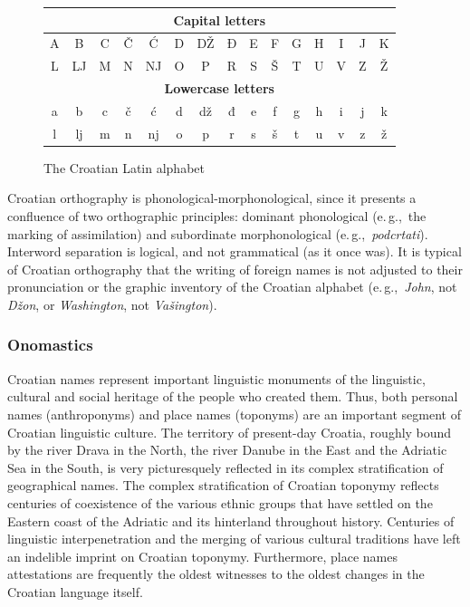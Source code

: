 \begin{multicols}{2}
\begin{figure}[htb]
\centering
	\begin{tabular} {|c|c|c|c|c|c|c|c|c|c|c|c|c|c|c|}
        \hline
        \multicolumn{15}{|c|}{\textbf{Capital letters}} \\ \hline
        A & B  & C & Č & Ć  & D & DŽ & Đ & E & F & G & H & I & J & K \\ \hline
        L & LJ & M & N & NJ & O & P  & R & S & Š & T & U & V & Z & Ž \\ \hline
        \multicolumn{15}{|c|}{\textbf{Lowercase letters}} \\ \hline
        a & b  & c & č & ć  & d & dž & đ & e & f & g & h & i & j & k \\ \hline
        l & lj & m & n & nj & o & p  & r & s & š & t & u & v & z & ž \\
        \hline
   \end{tabular}
  \caption{The Croatian Latin alphabet }
  \label{fig:abeceda_en}
\end{figure}

Croatian orthography is phonological-morphonological, since it presents a confluence of two orthographic principles: dominant phonological (e.\,g.,~the marking of assimilation) and subordinate morphonological (e.\,g.,~\emph{podcrtati}). Interword separation is logical, and not grammatical (as it once was). It is typical of Croatian orthography that the writing of foreign names is not adjusted to their pronunciation or the graphic inventory of the Croatian alphabet (e.\,g.,~\emph{John}, not \emph{Džon}, or \emph{Washington}, not \emph{Vašington}).

\subsubsection{Onomastics}

Croatian names represent important linguistic monuments of the linguistic, cultural and social heritage of the people who created them. Thus, both personal names (anthroponyms) and place names (toponyms) are an important segment of Croatian linguistic culture. The territory of present-day Croatia, roughly bound by the river Drava in the North, the river Danube  in the East and the Adriatic Sea in the South, is very picturesquely reflected in its complex stratification of geographical names. The complex stratification of Croatian toponymy reflects centuries of coexistence of the various ethnic groups that have settled on the Eastern coast of the Adriatic and its hinterland throughout history. Centuries of linguistic interpenetration and the merging of various cultural traditions have left an indelible imprint on Croatian toponymy. Furthermore, place names attestations are frequently the oldest witnesses to the oldest changes in the Croatian language itself. 


\end{multicols}

